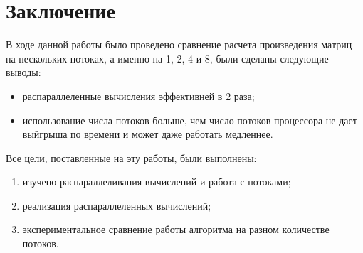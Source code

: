 \chapter*{Заключение}

В ходе данной работы было проведено сравнение расчета произведения матриц на нескольких потоках,
а именно на 1, 2, 4 и 8, были сделаны следующие выводы:

\begin{itemize}
	\item распараллеленные вычисления эффективней в 2 раза;
	\item использование числа потоков больше, чем число потоков процессора не дает выйгрыша по времени и может даже работать медленнее.
\end{itemize}

Все цели, поставленные на эту работы, были выполнены:

\begin{enumerate}
	\item изучено распараллеливания вычислений и работа с потоками;
	\item реализация распараллеленных вычислений;
	\item экспериментальное сравнение работы алгоритма на разном количестве потоков.
\end{enumerate}
